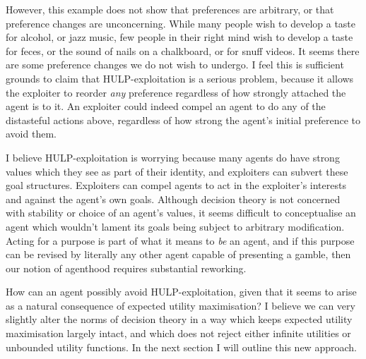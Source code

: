\documentclass{article}
\begin{document}
However, this example does not show that preferences are arbitrary, or that preference changes are unconcerning. While many people wish to develop a taste for alcohol, or jazz music, few people in their right mind wish to develop a taste for feces, or the sound of nails on a chalkboard, or for snuff videos. It seems there are some preference changes we do not wish to undergo. I feel this is sufficient grounds to claim that HULP-exploitation is a serious problem, because it allows the exploiter to reorder \textit{any} preference regardless of how strongly attached the agent is to it. An exploiter could indeed compel an agent to do any of the distasteful actions above, regardless of how strong the agent's initial preference to avoid them.

I believe HULP-exploitation is worrying because many agents do have strong values which they see as part of their identity, and exploiters can subvert these goal structures. Exploiters can compel agents to act in the exploiter's interests and against the agent's own goals. Although decision theory is not concerned with stability or choice of an agent's values, it seems difficult to conceptualise an agent which wouldn't lament its goals being subject to arbitrary modification. Acting for a purpose is part of what it means to \textit{be} an agent, and if this purpose can be revised by literally any other agent capable of presenting a gamble, then our notion of agenthood requires substantial reworking.

How can an agent possibly avoid HULP-exploitation, given that it seems to arise as a natural consequence of expected utility maximisation? I believe we can very slightly alter the norms of decision theory in a way which keeps expected utility maximisation largely intact, and which does not reject either infinite utilities or unbounded utility functions. In the next section I will outline this new approach. 


\end{document}
